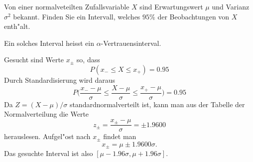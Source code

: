 Von einer normalveteilten Zufallsvariable $X$ sind Erwartungswert $\mu$
und Varianz $\sigma^2$ bekannt. Finden Sie ein Intervall, welches
$95\%$ der Beobachtungen von $X$ enth"alt.

Ein solches Interval heisst ein $\alpha$-Vertrauensinterval.

\begin{loesung}
Gesucht sind Werte $x_\pm$ so, dass 
\[
P(x_-\le X\le x_+)=0.95
\]
Durch Standardisierung wird daraus
\[
P\biggl(\frac{x_--\mu}{\sigma}\le \frac{X-\mu}{\sigma} \le \frac{x_+-\mu}{\sigma}\biggr)
=0.95
\]
Da $Z=(X-\mu)/\sigma$ standardnormalverteilt ist, kann man aus der
Tabelle der Normalverteilung die Werte
\[
z_\pm=\frac{x_\pm -\mu}{\sigma}=\pm1.9600
\]
herauslesen. Aufgel"ost nach $x_\pm$ findet man
\[
x_\pm = \mu\pm1.9600\sigma.
\]
Das gesuchte Interval ist also $[\mu-1.96\sigma,\mu+1.96\sigma]$.
\end{loesung}

